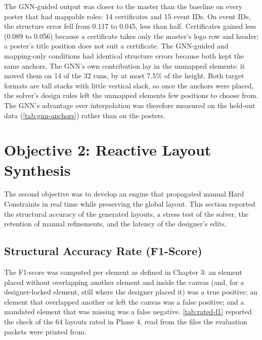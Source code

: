 \begin{refsection}
The GNN-guided output was closer to the master than the baseline on every poster that had mappable roles: 14 certificates and 15 event IDs. On event IDs, the structure error fell from 0.117 to 0.045, less than half. Certificates gained less (0.089 to 0.056) because a certificate takes only the master's logo row and header; a poster's title position does not suit a certificate. The GNN-guided and mapping-only conditions had identical structure errors because both kept the same anchors. The GNN's own contribution lay in the unmapped elements: it moved them on 14 of the 32 runs, by at most 7.5\% of the height. Both target formats are tall stacks with little vertical slack, so once the anchors were placed, the solver's design rules left the unmapped elements few positions to choose from. The GNN's advantage over interpolation was therefore measured on the held-out data (\ref{tab:gnn-anchors}) rather than on the posters.

\section{Objective 2: Reactive Layout Synthesis}

The second objective was to develop an engine that propagated manual Hard Constraints in real time while preserving the global layout. This section reported the structural accuracy of the generated layouts, a stress test of the solver, the retention of manual refinements, and the latency of the designer's edits.

\subsection{Structural Accuracy Rate (F1-Score)}

The F1-score was computed per element as defined in Chapter 3: an element placed without overlapping another element and inside the canvas (and, for a designer-locked element, still where the designer placed it) was a true positive; an element that overlapped another or left the canvas was a false positive; and a mandated element that was missing was a false negative. \ref{tab:rated-f1} reported the check of the 64 layouts rated in Phase 4, read from the files the evaluation packets were printed from.


\end{refsection}
